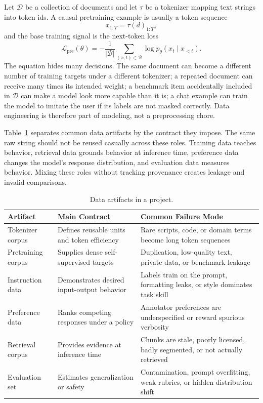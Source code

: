 Let $\mathcal{D}$ be a collection of documents and let $\tau$ be a tokenizer mapping text strings into token ids. A causal pretraining example is usually a token sequence
\begin{equation}
  x_{1:T} = {\tau(d)}_{1:T},
\end{equation}
and the base training signal is the next-token loss
\begin{equation}
  \mathcal{L}_{\mathrm{pre}}(\theta)
  = -\frac{1}{|\mathcal{B}|}\sum_{(x,t)\in \mathcal{B}}
      \log p_{\theta}(x_t \mid x_{<t}).
\end{equation}
The equation hides many decisions. The same document can become a different number of training targets under a different tokenizer; a repeated document can receive many times its intended weight; a benchmark item accidentally included in $\mathcal{D}$ can make a model look more capable than it is; a chat example can train the model to imitate the user if its labels are not masked correctly. Data engineering is therefore part of modeling, not a preprocessing chore.

Table~\ref{tab:data-artifacts} separates common data artifacts by the contract they impose. The same raw string should not be reused casually across these roles. Training data teaches behavior, retrieval data grounds behavior at inference time, preference data changes the model's response distribution, and evaluation data measures behavior. Mixing these roles without tracking provenance creates leakage and invalid comparisons.

\begin{table}[t]
\caption{Data artifacts in a \llm project.}
\label{tab:data-artifacts}
\small
\begin{tabular}{@{}p{2.5cm}p{4.1cm}p{5.2cm}@{}}
\toprule
Artifact & Main Contract & Common Failure Mode \\
\midrule
Tokenizer corpus & Defines reusable units and token efficiency & Rare scripts, code, or domain terms become long token sequences \\
Pretraining corpus & Supplies dense self-supervised targets & Duplication, low-quality text, private data, or benchmark leakage \\
Instruction data & Demonstrates desired input-output behavior & Labels train on the prompt, formatting leaks, or style dominates task skill \\
Preference data & Ranks competing responses under a policy & Annotator preferences are underspecified or reward spurious verbosity \\
Retrieval corpus & Provides evidence at inference time & Chunks are stale, poorly licensed, badly segmented, or not actually retrieved \\
Evaluation set & Estimates generalization or safety & Contamination, prompt overfitting, weak rubrics, or hidden distribution shift \\
\bottomrule
\end{tabular}
\end{table}


